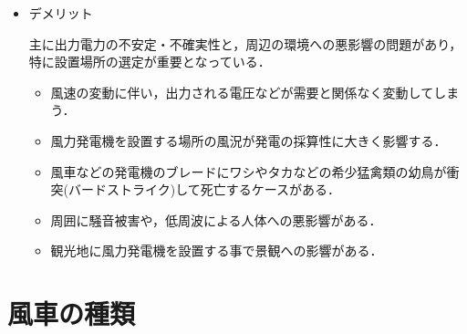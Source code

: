 \documentclass[a4paper,12pt,showkeys]{jreport}
\begin{document}
\begin{itemize}
\item デメリット

主に出力電力の不安定・不確実性と，周辺の環境への悪影響の問題があり，特に設置場所の選定が重要となっている．
\begin{itemize}

\item 風速の変動に伴い，出力される電圧などが需要と関係なく変動してしまう．

\item 風力発電機を設置する場所の風況が発電の採算性に大きく影響する．

\item 風車などの発電機のブレードにワシやタカなどの希少猛禽類の幼鳥が衝突(バードストライク)して死亡するケースがある．

\item 周囲に騒音被害や，低周波による人体への悪影響がある．

\item 観光地に風力発電機を設置する事で景観への影響がある．
\end{itemize}
\end{itemize}

\section{風車の種類}
\end{document}
